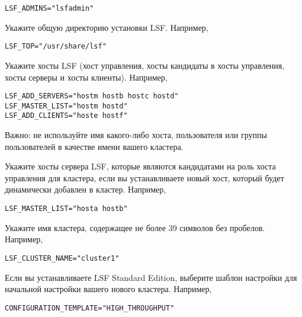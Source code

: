 \begin{lstlisting}
LSF_ADMINS="lsfadmin"
\end{lstlisting}

Укажите общую директорию установки LSF. Например,

\begin{lstlisting}
LSF_TOP="/usr/share/lsf"
\end{lstlisting}

Укажите хосты LSF (хост управления, хосты кандидаты в хосты управления, хосты серверы и хосты клиенты). Например,

\begin{lstlisting}
LSF_ADD_SERVERS="hostm hostb hostc hostd"
LSF_MASTER_LIST="hostm hostd"
LSF_ADD_CLIENTS="hoste hostf"
\end{lstlisting}

Важно: не используйте имя какого-либо хоста, пользователя или группы пользователей в качестве имени вашего кластера.

Укажите хосты сервера LSF, которые являются кандидатами на роль хоста управления для кластера, если вы устанавливаете новый хост, который будет динамически добавлен в кластер. Например,

\begin{lstlisting}
LSF_MASTER_LIST="hosta hostb"
\end{lstlisting}

Укажите имя кластера, содержащее не более 39 символов без пробелов. Например,

\begin{lstlisting}
LSF_CLUSTER_NAME="cluster1"
\end{lstlisting}

Если вы устанавливаете LSF Standard Edition, выберите шаблон настройки для начальной настройки вашего нового кластера. Например,

\begin{lstlisting}
CONFIGURATION_TEMPLATE="HIGH_THROUGHPUT"
\end{lstlisting}


